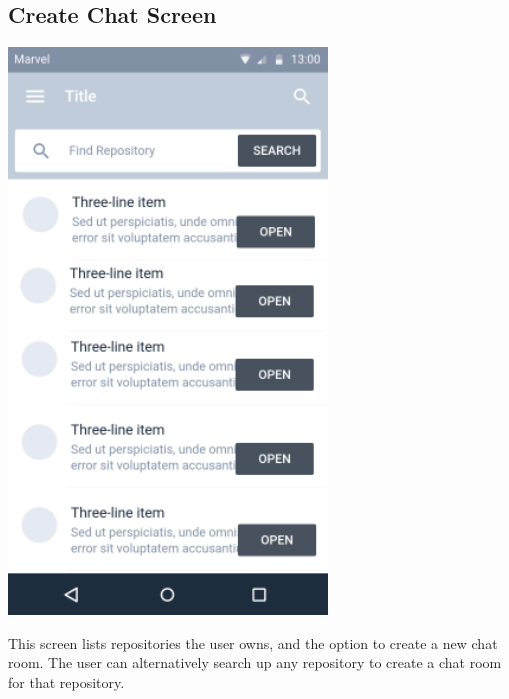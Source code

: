 \documentclass{report}
\begin{document}
\subsection{Create Chat Screen}
\begin{center}
    \includegraphics[scale=0.5]{design-create-chat}
\end{center}
This screen lists repositories the user owns, and the option to create a new chat room. The user can alternatively search up any repository to create a chat room for that repository.

\newpage
\end{document}
